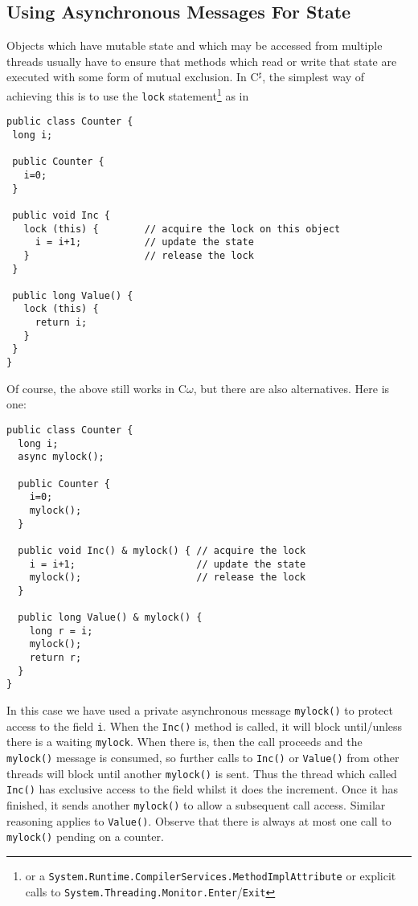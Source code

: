 \documentclass{article}
\newcommand{\comega}{\mbox{C$\omega$}}
\newcommand{\csharp}{\mbox{C$^\sharp$}}
\begin{document}
\subsection{Using Asynchronous Messages For State}
Objects which have mutable state and which may be accessed from
multiple threads usually have to ensure that methods which read or
write that state are executed with some form of mutual exclusion. In \csharp, the simplest way of achieving this is to use the \verb|lock| statement\footnote{or a \texttt{System.Runtime.CompilerServices.MethodImplAttribute} or explicit calls to \texttt{System.Threading.Monitor.Enter}/\texttt{Exit}} as in
\begin{verbatim}
public class Counter {
 long i;

 public Counter {
   i=0;
 }

 public void Inc {
   lock (this) {        // acquire the lock on this object
     i = i+1;           // update the state
   }                    // release the lock
 }

 public long Value() {
   lock (this) {
     return i;
   }
 }
}
\end{verbatim}
Of course, the above still works in \comega, but there are also alternatives. Here is one:
\begin{verbatim}
public class Counter {
  long i;
  async mylock();

  public Counter {
    i=0;
    mylock();
  }

  public void Inc() & mylock() { // acquire the lock
    i = i+1;                     // update the state
    mylock();                    // release the lock
  }

  public long Value() & mylock() {
    long r = i;
    mylock();
    return r;
  }
}
\end{verbatim}
In this case we have used a private asynchronous message
\verb|mylock()| to protect access to the field \verb|i|. When the
\verb|Inc()| method is called, it will block until/unless there is a
waiting \verb|mylock|. When there is, then the call proceeds and the
\verb|mylock()| message is consumed, so further calls to \verb|Inc()|
or \verb|Value()| from other threads will block until another
\verb|mylock()| is sent. Thus the thread which called \verb|Inc()| has
exclusive access to the field whilst it does the increment. Once it
has finished, it sends another \verb|mylock()| to allow a subsequent
call access. Similar reasoning applies to \verb|Value()|. Observe that
there is always at most one call to \verb|mylock()| pending on a
counter.
\end{document}
